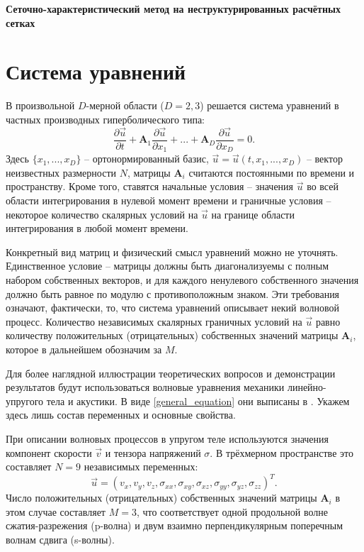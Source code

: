 \begin{center}
	\Large\textbf{{{Сеточно-характеристический метод на неструктурированных расчётных сетках}}}
\end{center}

\section{Система уравнений}
В произвольной $D$-мерной области ($D = 2, 3$) решается система уравнений 
в частных производных гиперболического типа:
\begin{equation}
\label{general_equation}
	\frac{\partial\vec{u}}{\partial{t}}+
	\mathbf{A}_1\frac{\partial\vec{u}}{\partial{x_1}}+...+
	\mathbf{A}_D\frac{\partial\vec{u}}{\partial{x_D}}=0.
\end{equation}
Здесь $\{x_1, ..., x_D\}$ -- ортонормированный базис, 
$\vec{u} = \vec{u}(t, x_1, ..., x_D)$ -- вектор неизвестных размерности $N$,
матрицы $\mathbf{A}_i$ считаются постоянными по времени и пространству.
Кроме того, ставятся начальные условия -- значения $\vec{u}$ 
во всей области интегрирования в нулевой момент времени и
граничные условия -- некоторое количество скалярных условий на $\vec{u}$ 
на границе области интегрирования в любой момент времени.

Конкретный вид матриц и физический смысл уравнений можно не уточнять. 
Единственное условие -- матрицы должны быть диагонализуемы с полным набором 
собственных векторов, и для каждого ненулевого собственного значения должно быть
равное по модулю с противоположным знаком. Эти требования означают, фактически,
то, что система уравнений описывает некий волновой процесс. Количество
независимых скалярных граничных условий на $\vec{u}$ равно количеству
положительных (отрицательных) собственных значений матрицы $\mathbf{A}_i$, 
которое в дальнейшем обозначим за $M$.

Для более наглядной иллюстрации теоретических вопросов и 
демонстрации результатов будут использоваться волновые уравнения 
механики линейно-упругого тела и акустики. В виде \eqref{general_equation}
они выписаны в \cite{chelnokov}. Укажем здесь лишь состав переменных 
и основные свойства. 

При описании волновых процессов в упругом теле используются значения 
компонент скорости $\vec{v}$ и тензора напряжений $\sigma$.
В трёхмерном пространстве это составляет $N = 9$ независимых переменных:
\begin{equation}
	\vec{u} = (v_x,v_y,v_z,\sigma_{xx},\sigma_{xy},\sigma_{xz},\sigma_{yy},\sigma_{yz},\sigma_{zz})^{T}.
\end{equation}
Число положительных (отрицательных) собственных значений матрицы $\mathbf{A}_i$ 
в этом случае составляет $M = 3$, что соответствует 
одной продольной волне сжатия-разрежения (p-волна) и 
двум взаимно перпендикулярным поперечным волнам сдвига (s-волны).

